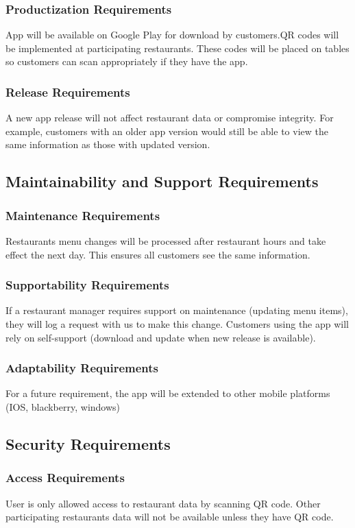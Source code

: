 \documentclass[12pt, titlepage]{article}
\begin{document}
\subsubsection{Productization Requirements}
App will be available on Google Play for download by customers.QR codes will be implemented at participating restaurants. These codes will be placed on tables so customers can scan appropriately if they have the app. 
\subsubsection{Release Requirements}
A new app release will not affect restaurant data or compromise 
integrity. For example, customers with an older app version would still be able to view the same information as those with updated version. 
\subsection{Maintainability and Support Requirements}
\subsubsection{Maintenance Requirements}
Restaurants menu changes will be processed after restaurant hours and take effect the next day. This ensures all customers see the same information. 
\subsubsection{Supportability Requirements}
If a restaurant manager requires support on maintenance (updating menu items), they will log a request with us to make this change. Customers using the app will rely on self-support (download and update when new release is available).
\subsubsection{Adaptability Requirements}
For a future requirement, the app will be extended to other mobile platforms (IOS, blackberry, windows) 
\subsection{Security Requirements}
\subsubsection{Access Requirements}
User is only allowed access to restaurant data by scanning QR code. Other participating restaurants data will not be available unless they have QR code. 
\end{document}
